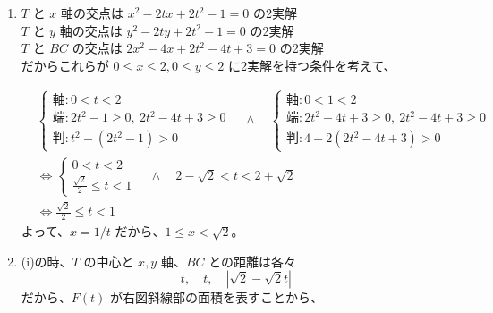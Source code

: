 \documentclass[../main.tex]{subfiles}
\begin{document}
\begin{enumerate}
  \item[(i)] $T$ と $x$ 軸の交点は $x^2 - 2tx + 2t^2 - 1 = 0$ の2実解\\
    $T$ と $y$ 軸の交点は $y^2 - 2ty + 2t^2 - 1 = 0$ の2実解\\
    $T$ と $BC$ の交点は $2x^2 - 4x + 2t^2 - 4t + 3 = 0$ の2実解\\
    だからこれらが $0 \le x \le 2, 0 \le y \le 2$ に2実解を持つ条件を考えて、

    \begin{align*}
      &
      \begin{cases}
        \text{軸}: 0 < t < 2 \\
        \text{端}: 2t^2 - 1 \ge 0, \ 2t^2 - 4t + 3 \ge 0 \\
        \text{判}: t^2 - (2t^2 - 1) > 0
      \end{cases}
      \quad \wedge \quad
      \begin{cases}
        \text{軸}: 0 < 1 < 2 \\
        \text{端}: 2t^2 - 4t + 3 \ge 0, \ 2t^2 - 4t + 3 \ge 0 \\
        \text{判}: 4 - 2(2t^2 - 4t + 3) > 0
      \end{cases}
      \\
      &\iff
      \begin{cases}
        0 < t < 2 \\
        \frac{\sqrt{2}}{2} \le t < 1
      \end{cases}
      \quad \wedge \quad
      2 - \sqrt{2} < t < 2 + \sqrt{2} \\
      &\iff \frac{\sqrt{2}}{2} \le t < 1
    \end{align*}
    よって、$x = 1/t$ だから、$1 \le x < \sqrt{2}$。

  \item[(ii)] (i)の時、$T$ の中心と $x, y$ 軸、$BC$ との距離は各々
    \[
      t, \quad t, \quad |\sqrt{2} - \sqrt{2}t|
    \]
    だから、$F(t)$ が右図斜線部の面積を表すことから、

    \begin{center}
    \end{center}


\end{enumerate}
\end{document}
